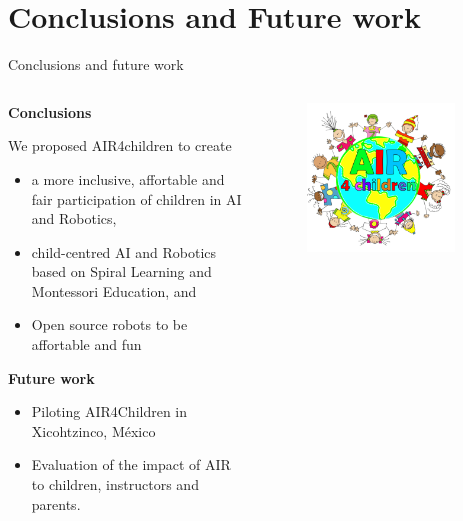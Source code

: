 \section{Conclusions and Future work}

{
\begin{frame}{Conclusions and future work}

  \begin{columns}
  \begin{column}{.75\linewidth}

  \textbf{Conclusions}   

  We proposed AIR4children to create
  \begin{itemize}
    \item a more inclusive, affortable and fair participation of children in AI and Robotics,
    \item child-centred AI and Robotics based on Spiral Learning and Montessori Education, and
    \item Open source robots to be affortable and fun 
  \end{itemize}

  \textbf{Future work}
  \begin{itemize}
    \item Piloting AIR4Children in Xicohtzinco, M\'exico
    \item Evaluation of the impact of AIR to children, instructors and parents. %
  \end{itemize}

    \end{column}


  \begin{column}{.3\linewidth}

      \begin{figure}
        \centering
        \includegraphics[width=0.9\textwidth]{./figures/future-work/versions/drawing-v00.png}
      \end{figure}


\end{column}
\end{columns}
\end{frame}}
